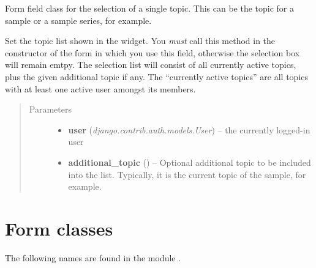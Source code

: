 \documentclass[a4paper,11pt,english]{sphinxmanual}
\begin{document}
\begin{fulllineitems}
\label{programming/utilities:jb_common.utils.views.TopicField}
Form field class for the selection of a single topic.  This can be
the topic for a sample or a sample series, for example.

\begin{fulllineitems}
\label{programming/utilities:jb_common.utils.views.TopicField.set_topics}
Set the topic list shown in the widget.  You \emph{must} call this
method in the constructor of the form in which you use this field,
otherwise the selection box will remain emtpy.  The selection list will
consist of all currently active topics, plus the given additional
topic if any.  The “currently active topics” are all topics with
at least one active user amongst its members.
\begin{quote}\begin{description}
\item[{Parameters}] \leavevmode\begin{itemize}
\item {} 
\textbf{user} (\emph{django.contrib.auth.models.User}) -- the currently logged-in user

\item {} 
\textbf{additional\_topic} () -- Optional additional topic to be included
into the list.  Typically, it is the current topic of the sample,
for example.

\end{itemize}

\end{description}\end{quote}

\end{fulllineitems}


\end{fulllineitems}



\section{Form classes}
\label{programming/utilities:form-classes}
The following names are found in the module .
\end{document}
